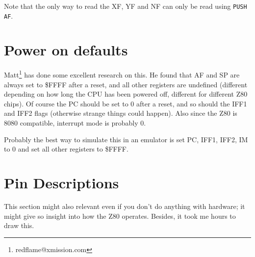 \documentclass[oneside,a4paper]{book}
\begin{document}
Note that the only way to read the XF, YF and NF can only be read using
{\tt PUSH AF}.


\section{Power on defaults}
\label{pon}

Matt\footnote{redflame@xmission.com} has done some excellent research on this. He found that AF and SP are always set to \$FFFF after a reset, and all other registers are undefined (different depending on how long the CPU has been powered off, different for different Z80 chips). Of course the PC should be set to 0 after a reset, and so should the IFF1 and IFF2 flags (otherwise strange things could happen). Also since the Z80 is 8080 compatible, interrupt mode is probably 0.

Probably the best way to simulate this in an emulator is set PC, IFF1, IFF2, IM to 0 and set all other registers to \$FFFF.


\section{Pin Descriptions \cite{datasheet}}

This section might also relevant even if you don't do anything with hardware; it might give so insight into how the Z80 operates. Besides, it took me hours to draw this.
\end{document}
